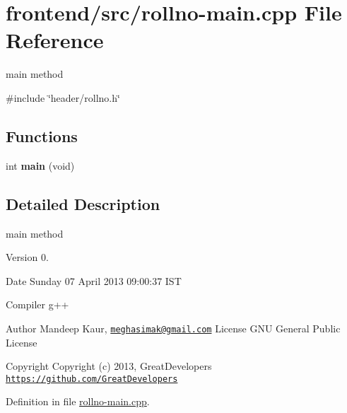 \hypertarget{rollno-main_8cpp}{\section{frontend/src/rollno-\/main.cpp \-File \-Reference}
\label{rollno-main_8cpp}
}


main method  


{\ttfamily \#include \char`\"{}header/rollno.\-h\char`\"{}}\*
\subsection*{\-Functions}
\begin{DoxyCompactItemize}
\item 
\hypertarget{rollno-main_8cpp_a840291bc02cba5474a4cb46a9b9566fe}{int {\bfseries main} (void)}\label{rollno-main_8cpp_a840291bc02cba5474a4cb46a9b9566fe}

\end{DoxyCompactItemize}


\subsection{\-Detailed \-Description}
main method \begin{DoxyVersion}{\-Version}
0. 
\end{DoxyVersion}
\begin{DoxyDate}{\-Date}
\-Sunday 07 \-April 2013 09\-:00\-:37 \-I\-S\-T\par
 \-Compiler g++
\end{DoxyDate}
\begin{DoxyAuthor}{\-Author}
\-Mandeep \-Kaur, \href{mailto:meghasimak@gmail.com}{\tt meghasimak@gmail.\-com} \-License \-G\-N\-U \-General \-Public \-License 
\end{DoxyAuthor}
\begin{DoxyCopyright}{\-Copyright}
\-Copyright (c) 2013, \-Great\-Developers \href{https://github.com/GreatDevelopers}{\tt https\-://github.\-com/\-Great\-Developers} 
\end{DoxyCopyright}


\-Definition in file \hyperlink{rollno-main_8cpp_source}{rollno-\/main.\-cpp}.

